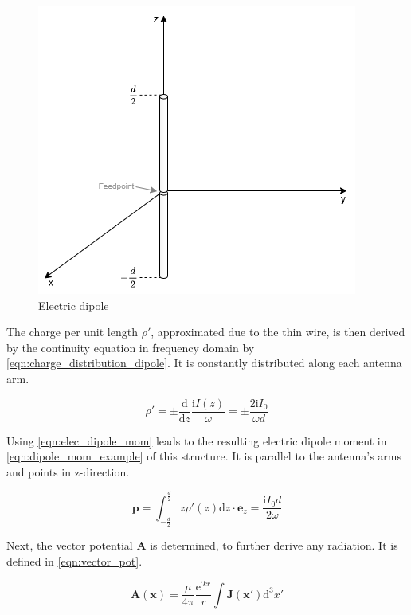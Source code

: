 \begin{figure}[h]
    \centering
    \includegraphics[width=0.5\linewidth]{Documentation//images/electric_dipole_drawing.png}
    \caption{Electric dipole}
    \label{fig:electric_dipole}
\end{figure}

The charge per unit length $\rho'$, approximated due to the thin wire, is then derived by the continuity equation in frequency domain by \autoref{eqn:charge_distribution_dipole}. It is constantly distributed along each antenna arm\cite{Griffiths_2024}\cite{Jackson}.

\begin{equation}
    \rho' = \pm\frac{\mathrm{d}}{\mathrm{d}z}\frac{\mathrm{i}I(z)}{\omega} = \pm\frac{2\mathrm{i}I_0}{\omega d}
    \label{eqn:charge_distribution_dipole}
\end{equation}

Using \autoref{eqn:elec_dipole_mom} leads to the resulting electric dipole moment in \autoref{eqn:dipole_mom_example} of this structure. It is parallel to the antenna's arms and points in z-direction\cite{Griffiths_2024}\cite{Jackson}. 

\begin{equation}
    \mathbf{p}=\int_{-\frac{d}{2}}^{\frac{d}{2}}z\rho'(z)\mathrm{d}z\cdot\mathbf{e}_z = \frac{\mathrm{i}I_0d}{2\omega}
    \label{eqn:dipole_mom_example}
\end{equation}

Next, the vector potential $\mathbf{A}$ is determined, to further derive any radiation. It is defined in \autoref{eqn:vector_pot}\cite{Balanis_1997}\cite{Jackson}. %

\begin{equation}
    \mathbf{A}(\mathbf{x})=\frac{\mu}{4\pi}\frac{\mathrm{e}^{\mathrm{i}kr}}{r}\int \mathbf{J}(\mathbf{x'})\mathrm{d}^3x'
    \label{eqn:vector_pot}
\end{equation}

